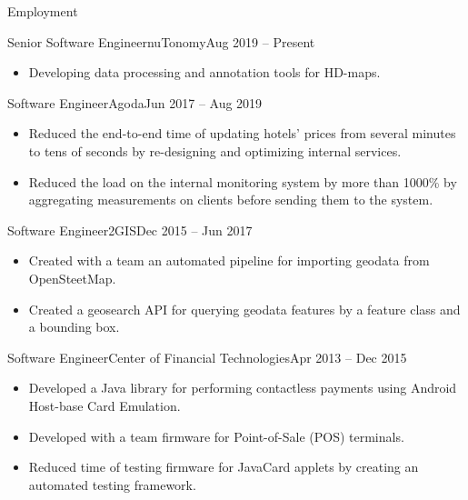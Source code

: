 \documentclass[]{cv}
\begin{document}
	\makeheader

	\begin{cvsection}{Employment}
		\begin{cvsubsection}{Senior Software Engineer}{nuTonomy}{Aug 2019 -- Present}
			\begin{itemize}
				\item Developing data processing and annotation tools for HD-maps.
			\end{itemize}
		\end{cvsubsection}

		\begin{cvsubsection}{Software Engineer}{Agoda}{Jun 2017 -- Aug 2019}
			\begin{itemize}
				\item Reduced the end-to-end time of updating hotels' prices from several minutes to tens of seconds by re-designing and optimizing internal services.
				\item Reduced the load on the internal monitoring system by more than 1000\% by aggregating measurements on clients before sending them to the system.
			\end{itemize}
		\end{cvsubsection}

		\begin{cvsubsection}{Software Engineer}{2GIS}{Dec 2015 -- Jun 2017}
			\begin{itemize}
				\item Created with a team an automated pipeline for importing geodata from OpenSteetMap.
				\item Created a geosearch API for querying geodata features by a feature class and a bounding box.
			\end{itemize}
		\end{cvsubsection}

		\begin{cvsubsection}{Software Engineer}{Center of Financial Technologies}{Apr 2013 -- Dec 2015}
			\begin{itemize}
        \item Developed a Java library for performing contactless payments using Android Host-base Card Emulation.
        \item Developed with a team firmware for Point-of-Sale (POS) terminals.
        \item Reduced time of testing firmware for JavaCard applets by creating an automated testing framework.
			\end{itemize}
		\end{cvsubsection}

	\end{cvsection}
\end{document}
